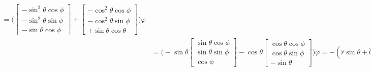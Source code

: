 \documentclass[10pt]{article}
\begin{document}
\begin{itemize}
\begin{align*}
      = \Bigg( \begin{bmatrix}      
        -\sin^2\theta \cos\phi \\
        -\sin^2\theta \sin\phi \\
        -\sin\theta \cos\phi
      \end{bmatrix}
      + \begin{bmatrix}      
        -\cos^2\theta \cos\phi \\
        -\cos^2\theta \sin\phi \\
        +\sin\theta \cos\theta
      \end{bmatrix}
      \Bigg) \dot\varphi\\
      &= \Bigg( -\sin\theta \begin{bmatrix}      
        \sin \theta \cos\phi \\
        \sin\theta \sin\phi \\
        \cos\phi
      \end{bmatrix}
      -\cos\theta \begin{bmatrix}      
        \cos \theta \cos\phi \\
        \cos \theta \sin\phi \\
        -\sin\theta
      \end{bmatrix}
      \Bigg) \dot\varphi
      = -(\hat r \sin\theta + \hat \theta \cos\theta) \dot\varphi.
    \end{align*}
  \end{itemize}  
  
\end{document}
